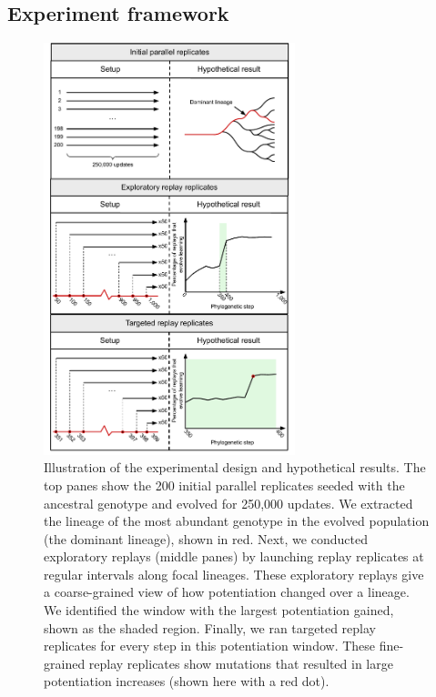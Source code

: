 \subsection{Experiment framework}

\begin{figure}[h!]
\begin{center}
\includegraphics[width=0.65\textwidth]{02_alife_2023_submission/media/conceptual_figure.pdf}
\caption{
    Illustration of the experimental design and hypothetical results.
    The top panes show the 200 initial parallel replicates seeded with the ancestral genotype and evolved for 250,000 updates.
    We extracted the lineage of the most abundant genotype in the evolved population (the dominant lineage), shown in red. 
    Next, we conducted exploratory replays (middle panes) by launching replay replicates at regular intervals along focal lineages. 
    These exploratory replays give a coarse-grained view of how potentiation changed over a lineage. 
    We identified the window with the largest potentiation gained, shown as the shaded region.
    Finally, we ran targeted replay replicates for every step in this potentiation window. 
    These fine-grained replay replicates show mutations that resulted in large potentiation increases (shown here with a red dot). 
}
\label{fig-conceptual}
\end{center}
\end{figure}


